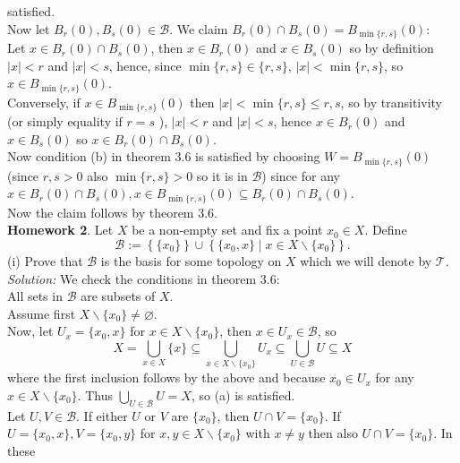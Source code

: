 \documentclass[a4paper]{article}
\begin{document}
satisfied.\\
\linebreak
Now let $B_r(0), B_s(0) \in \mathcal{B}$. We claim
$B_r (0) \cap B_s(0) = B_{\min\{r,s\}}(0)$:\\
Let $x \in B_r(0) \cap B_s(0)$, then $x \in B_r(0)$ and $x \in B_s(0)$ so
by definition  $|x| < r$ and $|x| < s$, hence, since $\min\{r,s\} \in \{r,s\}$,
$|x| < \min \{r,s\}$, so  $x \in B_{\min \{r,s\}}(0)$.\\
Conversely, if $x \in B_{\min \{r,s\}}(0)$ then 
$|x| < \min\{r,s\} \le r,s$, so by transitivity (or simply equality if $r=s$ ),
$|x| < r$ and $|x| < s$, hence
$x \in B_r(0)$ and $x \in B_s(0)$ so $x \in B_r(0) \cap B_s(0)$.\\
Now condition (b) in theorem 3.6 is satisfied by choosing $W
= B_{\min\{r,s\}}(0)$ (since $r,s > 0$ also $\min\{r,s\} >0$ so it is in
$\mathcal{B}$) since for any $x \in B_r(0) \cap B_s(0), x \in
B_{\min\{r,s\}}(0) \subseteq B_r(0) \cap B_s(0)$.\\
Now the claim follows by theorem 3.6.\\
\linebreak
\textbf{Homework 2}. Let $X$ be a non-empty set and fix a point $x_0 \in X$.
Define
\[
    \mathcal{B} := \left\{ \{x_0\} \right\} \cup \left\{ \{x_0, x\}  \mid 
    x \in X \backslash \{x_0\} \right\} 
.\] 
(i) Prove that $\mathcal{B}$ is the basis for some topology on $X$ which we
will denote by $\mathcal{T}$.\\
\linebreak
\textit{Solution:} We check the conditions in theorem 3.6:\\
All sets in $\mathcal{B}$ are subsets of $X$.\\
\linebreak
Assume first $X \backslash \{x_0\} \neq \varnothing$.\\
Now, let $U_x = \{x_0, x\}$ for $x \in X \backslash \{x_0\}$, then
$x \in U_x \in \mathcal{B}$, so
\[
    X = \bigcup_{x \in X} \{x\} \subseteq \bigcup_{x \in X \backslash \{x_0\}}
    U_x \subseteq \bigcup_{U \in \mathcal{B}} U \subseteq X
\] 
where the first inclusion follows by the above and because $x_0 \in U_x$ for
any $x \in X \backslash \{x_0\}$.
Thus $\bigcup_{U \in \mathcal{B}} U = X$, so (a) is satisfied.\\
Let  $U,V \in \mathcal{B}$. If either $U$ or $V$ are $\{x_0\}$, then
$U\cap V = \{x_0\}$. If $U = \{x_0, x\}, V = \{x_0, y\}$ for $x,y \in
X \backslash \{x_0\}$ with $x \neq y$ then also $U \cap V = \{x_0\}$. In these
\end{document}

